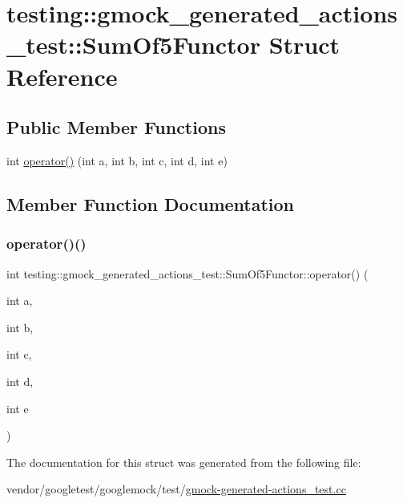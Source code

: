 \hypertarget{structtesting_1_1gmock__generated__actions__test_1_1_sum_of5_functor}{}\section{testing\+:\+:gmock\+\_\+generated\+\_\+actions\+\_\+test\+:\+:Sum\+Of5\+Functor Struct Reference}
\label{structtesting_1_1gmock__generated__actions__test_1_1_sum_of5_functor}
\subsection*{Public Member Functions}
\begin{DoxyCompactItemize}
\item 
int \hyperlink{structtesting_1_1gmock__generated__actions__test_1_1_sum_of5_functor_aa3d751efb237e12ecdf1528f2b73da04}{operator()} (int a, int b, int c, int d, int e)
\end{DoxyCompactItemize}


\subsection{Member Function Documentation}
\mbox{\label{structtesting_1_1gmock__generated__actions__test_1_1_sum_of5_functor_aa3d751efb237e12ecdf1528f2b73da04}} 
\subsubsection{\texorpdfstring{operator()()}{operator()()}}
{\footnotesize\ttfamily int testing\+::gmock\+\_\+generated\+\_\+actions\+\_\+test\+::\+Sum\+Of5\+Functor\+::operator() (\begin{DoxyParamCaption}\item[{int}]{a,  }\item[{int}]{b,  }\item[{int}]{c,  }\item[{int}]{d,  }\item[{int}]{e }\end{DoxyParamCaption})\hspace{0.3cm}{\ttfamily [inline]}}



The documentation for this struct was generated from the following file\+:\begin{DoxyCompactItemize}
\item 
vendor/googletest/googlemock/test/\hyperlink{gmock-generated-actions__test_8cc}{gmock-\/generated-\/actions\+\_\+test.\+cc}\end{DoxyCompactItemize}
